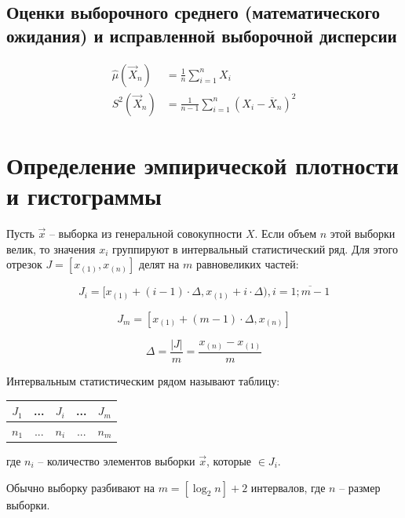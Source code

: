 \documentclass[12pt]{report}
\begin{document}
\subsection*{Оценки выборочного среднего (математического ожидания) и исправленной выборочной дисперсии}
\begin{equation}
	\begin{aligned}
		\hat\mu(\vec X_n) &= \frac 1n \sum_{i=1}^n X_i\\
		S^2(\vec X_n) &= \frac 1{n-1} \sum_{i=1}^n (X_i-\overline X_n)^2
	\end{aligned}
\end{equation}

\section*{Определение эмпирической плотности и гистограммы}

Пусть $\vec x$ -- выборка из генеральной совокупности $X$. Если объем $n$ этой выборки велик, то значения $x_i$ группируют в интервальный статистический ряд. Для этого отрезок $J = [x_{(1)}, x_{(n)}]$ делят на $m$ равновеликих частей:

\begin{equation*}
	J_i = [x_{(1)} + (i - 1) \cdot \Delta, x_{(1)} + i \cdot \Delta), i = \overline{1; m - 1}
\end{equation*}

\begin{equation*}
	J_{m} = [x_{(1)} + (m - 1) \cdot \Delta, x_{(n)}]
\end{equation*}

\begin{equation*}
	\Delta = \frac{|J|}{m} = \frac{x_{(n)} - x_{(1)}}{m}
\end{equation*}

Интервальным статистическим рядом называют таблицу:

\begin{table}[htb]
	\centering
	\begin{tabular}{|c|c|c|c|c|}
		\hline
		$J_1$ & ... & $J_i$ & ... & $J_m$ \\
		\hline
		$n_1$ & ... & $n_i$ & ... & $n_m$ \\
		\hline
	\end{tabular}
\end{table}

где $n_i$ -- количество элементов выборки $\vec x$, которые $\in J_i$.

Обычно выборку разбивают на $m=[\log_2n]+2$ интервалов, где $n$ -- размер выборки.
\end{document}
